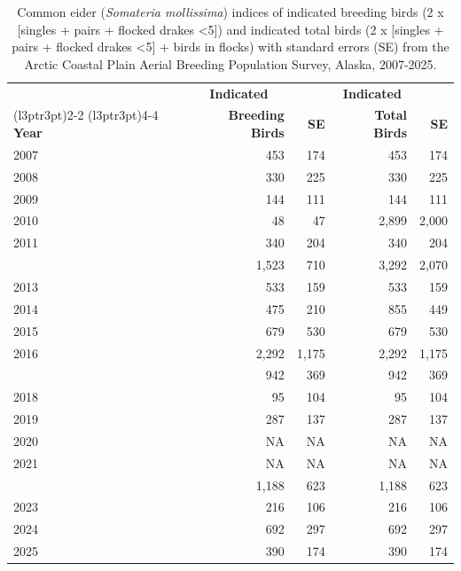 \documentclass[
]{article}
\begin{document}
\begin{longtable}[t]{lrrrr}

\caption{\label{tbl-COEI}Common eider (\emph{Somateria mollissima})
indices of indicated breeding birds (2 x {[}singles + pairs + flocked
drakes \textless5{]}) and indicated total birds (2 x {[}singles + pairs
+ flocked drakes \textless5{]} + birds in flocks) with standard errors
(SE) from the Arctic Coastal Plain Aerial Breeding Population Survey,
Alaska, 2007-2025.}

\tabularnewline

\\
\toprule
\multicolumn{1}{c}{\textbf{ }} & \multicolumn{1}{c}{\textbf{Indicated}} & \multicolumn{1}{c}{\textbf{ }} & \multicolumn{1}{c}{\textbf{Indicated}} & \multicolumn{1}{c}{\textbf{ }} \\
\cmidrule(l{3pt}r{3pt}){2-2} \cmidrule(l{3pt}r{3pt}){4-4}
\textbf{Year} & \textbf{Breeding Birds} & \textbf{SE} & \textbf{Total Birds} & \textbf{SE}\\
\midrule
2007 & 453 & 174 & 453 & 174\\
2008 & 330 & 225 & 330 & 225\\
2009 & 144 & 111 & 144 & 111\\
2010 & 48 & 47 & 2,899 & 2,000\\
2011 & 340 & 204 & 340 & 204\\
\addlinespace
2012 & 1,523 & 710 & 3,292 & 2,070\\
2013 & 533 & 159 & 533 & 159\\
2014 & 475 & 210 & 855 & 449\\
2015 & 679 & 530 & 679 & 530\\
2016 & 2,292 & 1,175 & 2,292 & 1,175\\
\addlinespace
2017 & 942 & 369 & 942 & 369\\
2018 & 95 & 104 & 95 & 104\\
2019 & 287 & 137 & 287 & 137\\
2020 & NA & NA & NA & NA\\
2021 & NA & NA & NA & NA\\
\addlinespace
2022 & 1,188 & 623 & 1,188 & 623\\
2023 & 216 & 106 & 216 & 106\\
2024 & 692 & 297 & 692 & 297\\
2025 & 390 & 174 & 390 & 174\\
\bottomrule

\end{longtable}
\end{document}

